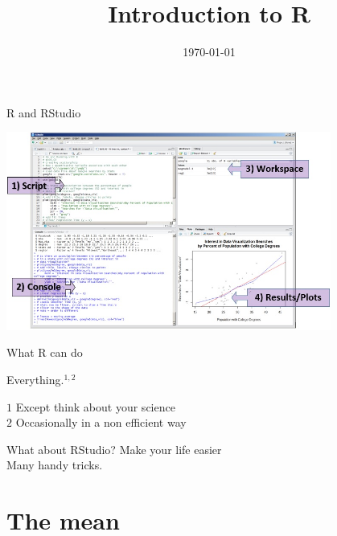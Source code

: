 \documentclass[10pt]{beamer}\usepackage[]{graphicx}\usepackage[]{color}
\title[\textbf{Intro to R}]{Introduction to R}
\date{\today}
\begin{document}
\begin{frame}
\maketitle	
\end{frame}

\begin{frame}{R and RStudio}
  \begin{center}
    \includegraphics[width=0.8\textwidth]{Figures/rstudiolayout}
  \end{center}
\end{frame}

\begin{frame}{What R can do}

  \pause \begin{exampleblock}{Everything.$^{1,2}$}
    
  {\tiny $1$ Except think about your science}\\
  {\tiny $2$ Occasionally in a non efficient way}
  \end{exampleblock}
  
  \pause \begin{block}{What about RStudio?}
  Make your life easier\\
  Many handy tricks.
  \end{block}
\end{frame}

\section{The mean}
\end{document}
